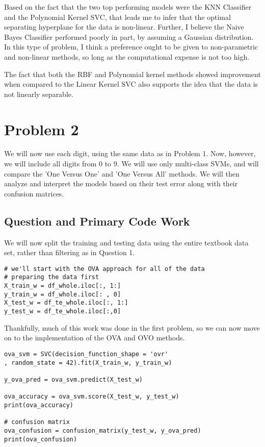 \documentclass[12pt, letterpaper]{article}
\begin{document}
Based on the fact that the two top performing models were the KNN Classifier and the Polynomial Kernel SVC, that leads me to infer that the optimal separating hyperplane for the data is non-linear. Further, I believe the Naive Bayes Classifier performed poorly in part, by assuming a Gaussian distribution. In this type of problem, I think a preference ought to be given to non-parametric and non-linear methods, so long as the computational expense is not too high. 

The fact that both the RBF and Polynomial kernel methods showed improvement when compared to the Linear Kernel SVC also supports the idea that the data is not linearly separable. 

\section{Problem 2} 

We will now use each digit, using the same data as in Problem 1. Now, however, we will include all digits from 0 to 9. We will use only multi-class SVMs, and will compare the 'One Versus One' and 'One Versus All' methods. We will then analyze and interpret the models based on their test error along with their confusion matrices. 

\subsection{Question and Primary Code Work} 

We will now split the training and testing data using the entire textbook data set, rather than filtering as in Question 1. 

\begin{verbatim} 
# we'll start with the OVA approach for all of the data 
# preparing the data first 
X_train_w = df_whole.iloc[:, 1:]
y_train_w = df_whole.iloc[: , 0]
X_test_w = df_te_whole.iloc[:, 1:]
y_test_w = df_te_whole.iloc[:,0]
\end{verbatim}

Thankfully, much of this work was done in the first problem, so we can now move on to the implementation of the OVA and OVO methods. 

\begin{verbatim} 
ova_svm = SVC(decision_function_shape = 'ovr'
, random_state = 42).fit(X_train_w, y_train_w)

y_ova_pred = ova_svm.predict(X_test_w) 

ova_accuracy = ova_svm.score(X_test_w, y_test_w) 
print(ova_accuracy) 

# confusion matrix 
ova_confusion = confusion_matrix(y_test_w, y_ova_pred) 
print(ova_confusion) 
\end{verbatim} 
\end{document}
